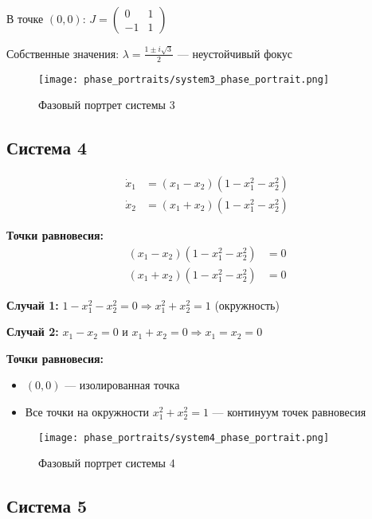 В точке $(0, 0)$: $J = \begin{pmatrix} 0 & 1 \\ -1 & 1 \end{pmatrix}$

Собственные значения: $\lambda = \frac{1 \pm i\sqrt{3}}{2}$ --- неустойчивый фокус

\begin{figure}[H]
\centering
\texttt{[image: phase\_portraits/system3\_phase\_portrait.png]}
\caption{Фазовый портрет системы 3}
\label{fig:system3_phase_portrait}
\end{figure}

\subsection*{Система 4}

\begin{align}
\dot{x}_1 &= (x_1 - x_2)(1 - x_1^2 - x_2^2) \\
\dot{x}_2 &= (x_1 + x_2)(1 - x_1^2 - x_2^2)
\end{align}

\textbf{Точки равновесия:}
\begin{align}
(x_1 - x_2)(1 - x_1^2 - x_2^2) &= 0 \\
(x_1 + x_2)(1 - x_1^2 - x_2^2) &= 0
\end{align}

\textbf{Случай 1:} $1 - x_1^2 - x_2^2 = 0 \Rightarrow x_1^2 + x_2^2 = 1$ (окружность)

\textbf{Случай 2:} $x_1 - x_2 = 0$ и $x_1 + x_2 = 0 \Rightarrow x_1 = x_2 = 0$

\textbf{Точки равновесия:}
\begin{itemize}
\item $(0, 0)$ --- изолированная точка
\item Все точки на окружности $x_1^2 + x_2^2 = 1$ --- континуум точек равновесия
\end{itemize}

\begin{figure}[H]
\centering
\texttt{[image: phase\_portraits/system4\_phase\_portrait.png]}
\caption{Фазовый портрет системы 4}
\label{fig:system4_phase_portrait}
\end{figure}

\subsection*{Система 5}

